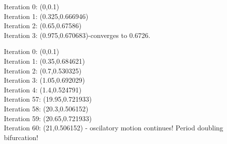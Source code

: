 \documentclass[11pt]{article}
\begin{document}
    \begin{solution}[Answer 2d-ii]
        Iteration 0: (0,0.1) \\
        Iteration 1: (0.325,0.666946) \\
        Iteration 2: (0.65,0.67586) \\
        Iteration 3: (0.975,0.670683)-converges to 0.6726.
    \end{solution}
    \newpage
    \begin{solution}
        Iteration 0: (0,0.1) \\
        Iteration 1: (0.35,0.684621) \\
        Iteration 2: (0.7,0.530325) \\
        Iteration 3: (1.05,0.692029) \\
        Iteration 4: (1.4,0.524791) \\
        Iteration 57: (19.95,0.721933) \\
        Iteration 58: (20.3,0.506152) \\
        Iteration 59: (20.65,0.721933)  \\
        Iteration 60: (21,0.506152) - oscilatory motion continues! Period doubling bifurcation!
    \end{solution}
\end{document}
